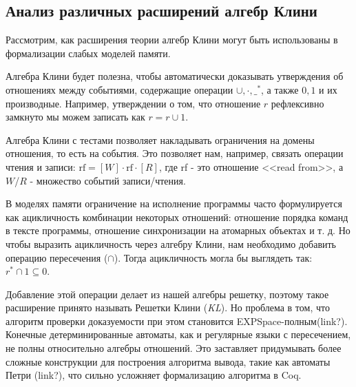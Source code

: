 \documentclass[times
              ]{itmo-student-thesis}
\begin{document}

  \subsection{Анализ различных расширений алгебр Клини}
    Рассмотрим, как расширения теории алгебр Клини могут быть использованы в формализации слабых моделей памяти.

    Алгебра Клини будет полезна, чтобы автоматически доказывать утверждения об отношениях между событиями,
    содержащие операции $ \cup, \cdot, \_^* $, а также $0, 1 $ и их производные.
    Например, утверждении о том, что отношение $ r $ рефлексивно замкнуто мы можем записать как $ r = r \cup 1 $.

    Алгебра Клини с тестами позволяет накладывать ограничения на домены отношения, то есть на события. Это позволяет нам, например, связать операции чтения и записи:
    $ \text{rf} = [W] \cdot \text{rf} \cdot [R] $,
      где rf - это отношение <<read from>>,
      а $W$/$R$ - множество событий записи/чтения.


    В моделях памяти ограничение на исполнение программы часто формулируется как ацикличность комбинации некоторых отношений: отношение порядка команд в тексте программы, отношение синхронизации на атомарных объектах и т. д.
    Но чтобы выразить ацикличность через алгебру Клини, нам необходимо добавить операцию пересечения ($\cap$).
    Тогда ацикличность могла бы выглядеть так: $ r^* \cap 1 \subseteq 0 $.

    Добавление этой операции делает из нашей алгебры решетку, поэтому такое расширение принято называть Решетки Клини (\textit{KL}).
    Но проблема в том, что алгоритм проверки доказуемости при этом становится EXPSpace-полным(link?).
    Конечные детерминированные автоматы, как и регулярные языки с пересечением, не полны относительно алгебры отношений.
    Это заставляет придумывать более сложные конструкции для построения алгоритма вывода, такие как автоматы Петри (link?), что сильно усложняет формализацию алгоритма в Coq.
\end{document}
